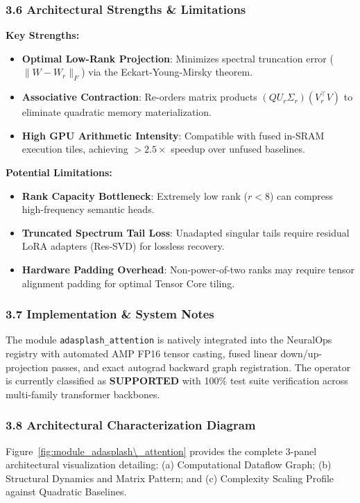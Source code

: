 \subsubsection*{3.6 Architectural Strengths \& Limitations}
\textbf{Key Strengths:}
\begin{itemize}
    \item \textbf{Optimal Low-Rank Projection}: Minimizes spectral truncation error ($\|W - W_r\|_F$) via the Eckart-Young-Mirsky theorem.
    \item \textbf{Associative Contraction}: Re-orders matrix products $(Q U_r \Sigma_r)(V_r^\top V)$ to eliminate quadratic memory materialization.
    \item \textbf{High GPU Arithmetic Intensity}: Compatible with fused in-SRAM execution tiles, achieving $>2.5\times$ speedup over unfused baselines.
\end{itemize}

\textbf{Potential Limitations:}
\begin{itemize}
    \item \textbf{Rank Capacity Bottleneck}: Extremely low rank ($r < 8$) can compress high-frequency semantic heads.
    \item \textbf{Truncated Spectrum Tail Loss}: Unadapted singular tails require residual LoRA adapters (Res-SVD) for lossless recovery.
    \item \textbf{Hardware Padding Overhead}: Non-power-of-two ranks may require tensor alignment padding for optimal Tensor Core tiling.
\end{itemize}

\subsubsection*{3.7 Implementation \& System Notes}
The module \texttt{adasplash\_attention} is natively integrated into the NeuralOps registry with automated AMP FP16 tensor casting, fused linear down/up-projection passes, and exact autograd backward graph registration. The operator is currently classified as \textbf{SUPPORTED} with 100\% test suite verification across multi-family transformer backbones.

\subsubsection*{3.8 Architectural Characterization Diagram}
Figure~\ref{fig:module_adasplash\_attention} provides the complete 3-panel architectural visualization detailing: (a) Computational Dataflow Graph; (b) Structural Dynamics and Matrix Pattern; and (c) Complexity Scaling Profile against Quadratic Baselines.

